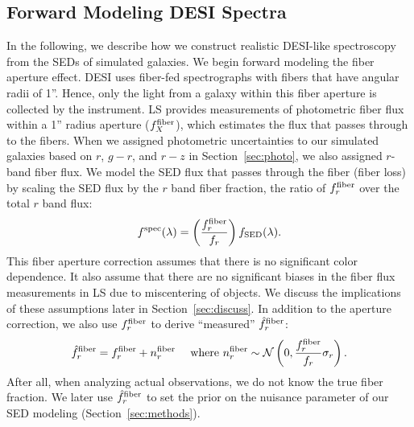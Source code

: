 \subsection{Forward Modeling DESI Spectra} \label{sec:spec}
In the following, we describe how we construct realistic DESI-like spectroscopy 
from the SEDs of simulated galaxies. 
We begin forward modeling the fiber aperture effect. %
DESI uses fiber-fed spectrographs with fibers that have angular radii of 1''. 
Hence, only the light from a galaxy within this fiber aperture is collected by
the instrument.
LS provides measurements of photometric fiber flux within a 1'' radius aperture
($f_X^{\rm fiber}$), which estimates the flux that passes through to the fibers.
When we assigned photometric uncertainties to our simulated galaxies based on
$r$, $g-r$, and $r-z$ in Section~\ref{sec:photo}, we also assigned $r$-band
fiber flux. 
We model the SED flux that passes through the fiber (fiber loss) by scaling the 
SED flux by the $r$ band fiber fraction, the ratio of $f_r^{\rm fiber}$ over
the total $r$ band flux: 
\begin{equation}
    f^{\rm spec}(\lambda) = \left(\frac{f_r^{\rm fiber}}{f_r}\right)f_{\rm SED}(\lambda).
\end{equation}
This fiber aperture correction assumes that there is no significant color
dependence. 
It also assume that there are no significant biases in the fiber flux
measurements in LS due to miscentering of objects. 
We discuss the implications of these assumptions later in
Section~\ref{sec:discuss}. 
In addition to the aperture correction, we also use $f_r^{\rm fiber}$ to derive
``measured'' $\hat{f}_r^{\rm fiber}$: 
\begin{equation}
    \hat{f}_r^{\rm fiber} = f_r^{\rm fiber} + n^{\rm fiber}_r \quad~{\rm
    where}~n^{\rm fiber}_r \sim \mathcal{N}\left(0, \frac{f_r^{\rm fiber}}{f_r}
    \sigma_r\right).
\end{equation}
After all, when analyzing actual observations, we do not know the true fiber
fraction. 
We later use $\hat{f}_r^{\rm fiber}$ to set the prior on the nuisance parameter
of our SED modeling (Section~\ref{sec:methods}).

